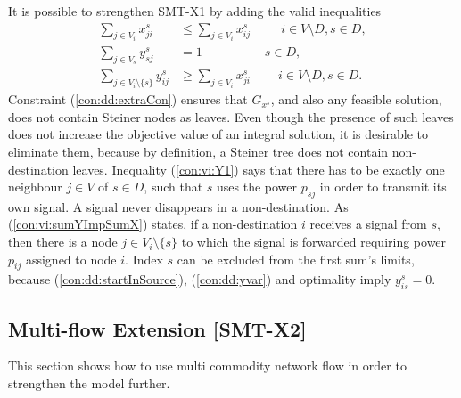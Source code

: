 It is possible to strengthen SMT-X1 by adding the valid inequalities
  \begin{subequations}[resume]
  \begin{flalign}
  \label{con:dd:extraCon} \sum\limits_{j\in V_{i}}x^s_{ji} & \leq \sum\limits_{j\in V_{i}}x^s_{ij}  \quad\quad ~~  	i\in V\setminus D, s\in D, \\	
 \label{con:vi:Y1}  \sum\limits_{j\in V_s}  y^{s}_{sj} & =1 \quad\quad\quad\quad\quad s\in D, \\
\label{con:vi:sumYImpSumX} \sum\limits_{j\in V_i\setminus\{s\} }y^{s}_{ij} & \geq \sum\limits_{j\in V_i}  x^{s}_{ji} ~ \quad\quad   i\in V\setminus D, s\in D. 
\end{flalign}
  \end{subequations}
Constraint (\ref{con:dd:extraCon}) ensures that $G_{x^s}$, and also any feasible solution, does not contain Steiner nodes as leaves. Even though the presence of such leaves does not increase the objective value of an integral solution, it is desirable to eliminate them, because by definition, a Steiner tree does not contain non-destination leaves. Inequality (\ref{con:vi:Y1}) says that there has to be exactly one neighbour $j\in V$ of $s\in D$, such that $s$ uses the power $p_{sj}$ in order to transmit its own signal. A signal never disappears in a non-destination. As (\ref{con:vi:sumYImpSumX}) states, if a non-destination $i$ receives a signal from $s$, then there is a node $j\in V_i\setminus\{s\}$ to which the signal is forwarded requiring power $p_{ij}$ assigned to node $i$. Index $s$ can be excluded from the first sum's limits, because (\ref{con:dd:startInSource}), (\ref{con:dd:yvar}) and optimality imply $y^s_{is}=0$.

\subsection{Multi-flow Extension [SMT-X2]}
This section shows how to use multi commodity network flow in order to strengthen the model further.
